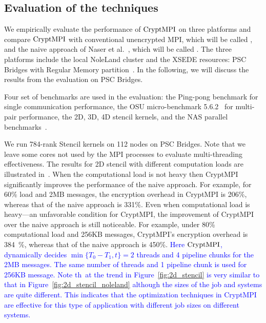 \subsection{Evaluation of the techniques}
\label{sec:eval}

We empirically evaluate the performance of $\textrm{CryptMPI}$ on
three platforms and compare $\textrm{CryptMPI}$ with
conventional unencrypted MPI, which will be called \Unencrypted,
and the naive approach of
Naser et al.~\cite{Cluster:Naser19}, which will be called {\Naive}.
The three platforms include the local NoleLand cluster and the XSEDE resources: PSC
Bridges with Regular Memory partition~\cite{XSEDE}.
In the following, we will discuss the results from the evaluation on PSC Bridges.

Four set of benchmarks are used in the evaluation: the Ping-pong benchmark for single
communication performance, the OSU micro-benchmark 5.6.2~\cite{OSUBM} for multi-pair
performance, the 2D, 3D, 4D stencil kernels, and the NAS parallel
benchmarks~\cite{Bailey:1991:NPB:2748645.2748648}.

We run 784-rank Stencil kernels on 112 nodes on PSC Bridges. Note that we leave
some cores not used by the MPI processes to evaluate multi-threading effectiveness. 
The results for 2D stencil with different computation loads
are illustrated in~.
When the computational load is not heavy then CryptMPI
significantly improves the performance of the naive  approach.
For example, for 60\% load and 2MB messages,
the encryption overhead in CryptMPI is 206\%,
whereas that of the naive approach is 331\%.
Even when computational load is heavy---an unfavorable condition for CryptMPI,
the improvement of CryptMPI over the naive approach is still noticeable.
For example, under 80\% computational load and 256KB messages, CryptMPI's encryption overhead is 384\
\%,
whereas that of the naive approach is 450\%. \textcolor{blue}{ Here $\textrm{CryptMPI}$,
dynamically decides $\min\{T_0-T_1, t\} = 2$ threads and 4 pipeline chunks for
the 2MB messages. The same number of threads and 1 pipeline chunk is used for 256KB message. Note th\
at the trend in Figure~\ref{fig:2d_stencil} is very similar to that in
Figure~\ref{fig:2d_stencil_noleland} although the sizes of the job and systems are
quite different. This indicates that the optimization techniques in CryptMPI
are effective for this type of application with different job sizes on different
systems.
}

